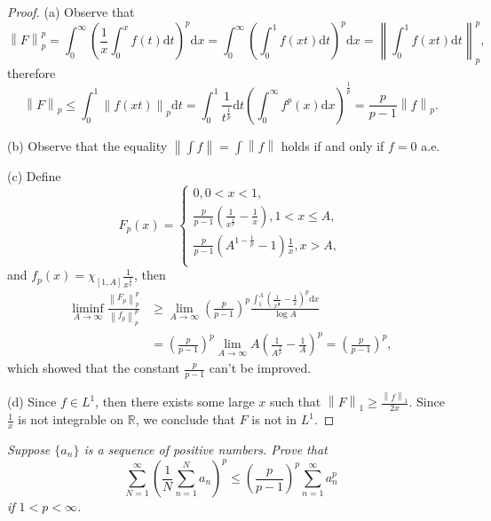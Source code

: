 \begin{proof}
(a) Observe that 
$$
\left\| F \right\| _{p}^{p}=\int_0^{\infty}{\left( \frac{1}{x}\int_0^x{f\left( t \right) \mathrm{d}t} \right) ^p\mathrm{d}x}=\int_0^{\infty}{\left( \int_0^1{f\left( xt \right) \mathrm{d}t} \right) ^p\mathrm{d}x}=\left\| \int_0^1{f\left( xt \right) \mathrm{d}t} \right\| _{p}^{p},
$$
therefore 
$$
\left\| F \right\| _p\le \int_0^1{\left\| f\left( xt \right) \right\| _p\mathrm{d}t}=\int_0^1{\frac{1}{t^{\frac{1}{p}}}\mathrm{d}t\left( \int_0^{\infty}{f^p\left( x \right) \mathrm{d}x} \right) ^{\frac{1}{p}}}=\frac{p}{p-1}\left\| f \right\| _p.
$$\par
(b) Observe that the equality $\left\| \int{f} \right\| =\int{\left\| f \right\|}$ holds if and only if $f=0$ a.e.\par
(c) Define 
$$
F_p\left( x \right) =\begin{cases}
	0,0<x<1,\\
	\frac{p}{p-1}\left( \frac{1}{x^{\frac{1}{p}}}-\frac{1}{x} \right) ,1<x\le A,\\
	\frac{p}{p-1}\left( A^{1-\frac{1}{p}}-1 \right) \frac{1}{x},x>A,\\
\end{cases}
$$
and $f_p\left( x \right) =\chi _{\left[ 1,A \right]}\frac{1}{x^{\frac{1}{p}}}$, then 
$$
\begin{aligned}
\mathop {\lim\mathrm{inf}} \limits_{A\rightarrow \infty}\frac{\left\| F_p \right\| _{p}^{p}}{\left\| f_p \right\| _{p}^{p}}&\ge \lim_{A\rightarrow \infty} \left( \frac{p}{p-1} \right) ^p\frac{\int_1^A{\left( \frac{1}{x^{\frac{1}{p}}}-\frac{1}{x} \right) ^p\mathrm{d}x}}{\log A}
\\
&=\left( \frac{p}{p-1} \right) ^p\lim_{A\rightarrow \infty} A\left( \frac{1}{A^{\frac{1}{p}}}-\frac{1}{A} \right) ^p=\left( \frac{p}{p-1} \right) ^p,    
\end{aligned}
$$
which showed that the constant $\frac{p}{p-1}$ can't be improved.\par
(d) Since $f\in L^1$, then there exists some large $x$ such that $\left\| F \right\| _1\ge \frac{\left\| f \right\| _1}{2x}$. Since $\frac{1}{x}$ is not integrable on $\mathbb{R}$, we conclude that $F$ is not in $L^1$.
\end{proof}
\begin{problem}\em
Suppose $\{a_n\}$ is a sequence of positive numbers. Prove that 
$$
\sum_{N=1}^{\infty}{\left( \frac{1}{N}\sum_{n=1}^N{a_n} \right) ^p}\le \left( \frac{p}{p-1} \right) ^p\sum_{n=1}^{\infty}{a_{n}^{p}}
$$
if $1<p<\infty$.
\end{problem}
